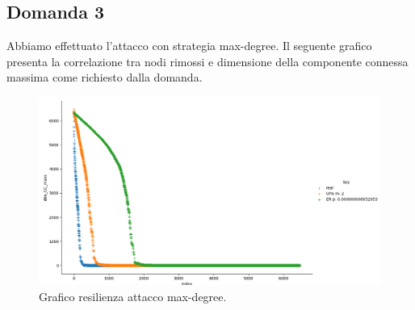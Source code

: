 \documentclass{article}
\begin{document}
\newpage
\begin{landscape}
    \section*{Domanda 3}
Abbiamo effettuato l'attacco con strategia max-degree. Il seguente grafico presenta la correlazione tra nodi rimossi e dimensione della componente connessa massima come richiesto dalla domanda.
	\begin{figure}[h]
		\centering
		\includegraphics[width=1.25\textwidth]{../grafici/Figure_3}
		\caption{Grafico resilienza attacco max-degree.}
	\end{figure}
\end{landscape}
\end{document}
